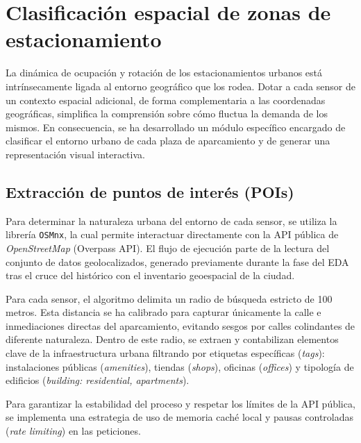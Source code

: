 \section{Clasificación espacial de zonas de estacionamiento}
\label{sec:clasificacion_espacial}

La dinámica de ocupación y rotación de los estacionamientos urbanos está intrínsecamente ligada al entorno geográfico que los rodea. Dotar a cada sensor de un contexto espacial adicional, de forma complementaria a las coordenadas geográficas, simplifica la comprensión sobre cómo fluctua la demanda de los mismos. En consecuencia, se ha desarrollado un módulo específico encargado de clasificar el entorno urbano de cada plaza de aparcamiento y de generar una representación visual interactiva.


\subsection{Extracción de puntos de interés (POIs)}
\label{subsec:extraccion_pois}

Para determinar la naturaleza urbana del entorno de cada sensor, se utiliza la librería \texttt{OSMnx}, la cual permite interactuar directamente con la API pública de \textit{OpenStreetMap} (Overpass API). El flujo de ejecución parte de la lectura del conjunto de datos geolocalizados, generado previamente durante la fase del EDA tras el cruce del histórico con el inventario geoespacial de la ciudad.

Para cada sensor, el algoritmo delimita un radio de búsqueda estricto de 100 metros. Esta distancia se ha calibrado para capturar únicamente la calle e inmediaciones directas del aparcamiento, evitando sesgos por calles colindantes de diferente naturaleza. Dentro de este radio, se extraen y contabilizan elementos clave de la infraestructura urbana filtrando por etiquetas específicas (\textit{tags}): instalaciones públicas (\textit{amenities}), tiendas (\textit{shops}), oficinas (\textit{offices}) y tipología de edificios (\textit{building: residential, apartments}). 

Para garantizar la estabilidad del proceso y respetar los límites de la API pública, se implementa una estrategia de uso de memoria caché local y pausas controladas (\textit{rate limiting}) en las peticiones.

